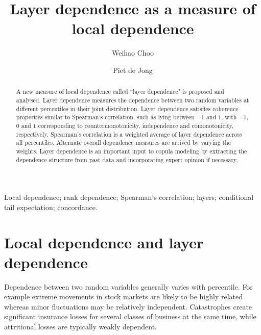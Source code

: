 \documentclass[authoryear]{elsarticle}
\begin{document}
 


\begin{frontmatter}



\title{Layer dependence as a measure of local dependence}
\author[acst]{Weihao Choo}
\author[acst]{Piet de Jong}



\address[acst]{Department of Applied Finance and Actuarial Studies Macquarie
University, NSW 2109, Australia.}




\begin{abstract}
A new measure of local dependence called  ``layer dependence" is proposed and analysed. Layer dependence measures the dependence between two random variables at different percentiles in their joint distribution. Layer dependence satisfies coherence properties similar to Spearman's correlation, such as lying between $-1$ and $1$, with $-1$, $0$ and $1$ corresponding to countermonotonicity, independence and comonotonicity, respectively. Spearman's correlation is  a weighted average of layer dependence across all percentiles.  Alternate overall dependence measures are arrived by varying the weights. Layer dependence is an important input to copula modeling by extracting the dependence structure from past data and incorporating expert opinion if necessary.
\end{abstract}

\begin{keyword}
Local dependence; rank dependence; Spearman's correlation; layers; conditional tail expectation; concordance.
\end{keyword}



\end{frontmatter}


\section{Local dependence and layer dependence}\label{sreview}


Dependence between two random variables generally varies with percentile. For example extreme movements in  stock markets are likely to be highly related  whereas minor fluctuations may be relatively independent.  Catastrophes create significant insurance losses for several classes of business at the same time, while attritional losses are typically weakly dependent.
\end{document}
